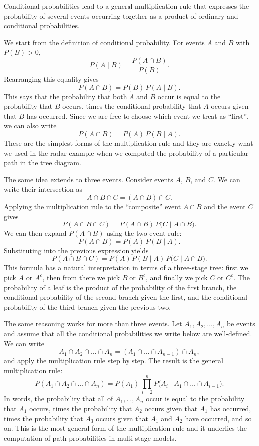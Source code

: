 Conditional probabilities lead to a general multiplication rule that expresses the probability of several events occurring together as a product of ordinary and conditional probabilities.

We start from the definition of conditional probability. For events \(A\) and \(B\) with \(P(B) > 0\),
\[
P(A \mid B) = \frac{P(A \cap B)}{P(B)}.
\]
Rearranging this equality gives
\[
P(A \cap B) = P(B)\,P(A \mid B).
\]
This says that the probability that both \(A\) and \(B\) occur is equal to the probability that \(B\) occurs, times the conditional probability that \(A\) occurs given that \(B\) has occurred. Since we are free to choose which event we treat as “first”, we can also write
\[
P(A \cap B) = P(A)\,P(B \mid A).
\]
These are the simplest forms of the multiplication rule and they are exactly what we used in the radar example when we computed the probability of a particular path in the tree diagram.

The same idea extends to three events. Consider events \(A\), \(B\), and \(C\). We can write their intersection as
\[
A \cap B \cap C = (A \cap B) \cap C.
\]
Applying the multiplication rule to the “composite” event \(A \cap B\) and the event \(C\) gives
\[
P(A \cap B \cap C)
= P(A \cap B)\,P\big(C \mid A \cap B\big).
\]
We can then expand \(P(A \cap B)\) using the two-event rule:
\[
P(A \cap B) = P(A)\,P(B \mid A).
\]
Substituting into the previous expression yields
\[
P(A \cap B \cap C)
= P(A)\,P(B \mid A)\,P\big(C \mid A \cap B\big).
\]
This formula has a natural interpretation in terms of a three-stage tree: first we pick \(A\) or \(A^c\), then from there we pick \(B\) or \(B^c\), and finally we pick \(C\) or \(C^c\). The probability of a leaf is the product of the probability of the first branch, the conditional probability of the second branch given the first, and the conditional probability of the third branch given the previous two.

The same reasoning works for more than three events. Let \(A_1, A_2, \dots, A_n\) be events and assume that all the conditional probabilities we write below are well-defined. We can write
\[
A_1 \cap A_2 \cap \dots \cap A_n
= (A_1 \cap \dots \cap A_{n-1}) \cap A_n,
\]
and apply the multiplication rule step by step. The result is the general multiplication rule:
\[
P(A_1 \cap A_2 \cap \dots \cap A_n)
= P(A_1)\,\prod_{i=2}^n P\big(A_i \mid A_1 \cap \dots \cap A_{i-1}\big).
\]
In words, the probability that all of \(A_1, \dots, A_n\) occur is equal to the probability that \(A_1\) occurs, times the probability that \(A_2\) occurs given that \(A_1\) has occurred, times the probability that \(A_3\) occurs given that \(A_1\) and \(A_2\) have occurred, and so on. This is the most general form of the multiplication rule and it underlies the computation of path probabilities in multi-stage models.

